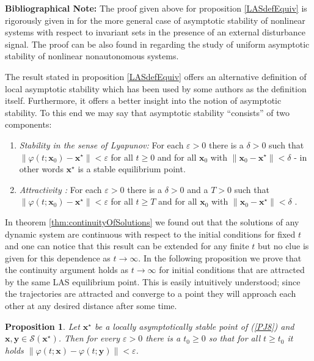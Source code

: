 \documentclass[a4paper,10pt,oneside]{book}
\newtheorem{proposition}[theorem]{Proposition}
\begin{document}
\noindent \textbf{Bibliographical Note: } The proof given above for proposition \ref{LASdefEquiv} is
rigorously given in \cite[Proposition 2.5]{Lin+96} for the more general case of asymptotic stability
of nonlinear systems with respect to invariant sets in the presence of an external disturbance signal.
The proof can be also found in \cite[Lemma 4.5]{Kha02} regarding the study of uniform asymptotic stability
of nonlinear nonautonomous systems.

%
%
%
%
%
%


The result stated in proposition \ref{LASdefEquiv} offers an alternative definition of local asymptotic stability which has been used by some authors as the definition itself. Furthermore, it offers a better insight into the notion of asymptotic stability. To this end we may say that asymptotic stability ``consists'' of two components:
\begin{enumerate}
 \item \emph{Stability in the sense of Lyapunov:} For each $\varepsilon>0$ there is a $\delta>0$ such that $\|\varphi(t;\mathbf{x}_0)-\mathbf{x}^\star\|<\varepsilon$ for all $t\geq 0$ and for all $\mathbf{x}_0$ with $\|\mathbf{x}_0-\mathbf{x}^\star\|<\delta$ - in other words $\mathbf{x}^\star$ is a stable equilibrium point.
 \item \emph{Attractivity :} For each $\varepsilon>0$ there is a $\delta>0$ and a $T>0$ such that $\|\varphi(t;\mathbf{x}_0)-\mathbf{x}^\star\|<\varepsilon$ for all $t\geq T$ and for all $\mathbf{x}_0$ with $\|\mathbf{x}_0-\mathbf{x}^\star\|<\delta$ .
\end{enumerate}
In theorem \ref{thm:continuityOfSolutions} we found out that the solutions of any dynamic system are continuous with respect to the initial conditions for fixed $t$ and one can notice that this result can be extended for any finite $t$ but no clue is given for this dependence as $t\to\infty$. In the following proposition we prove that the continuity argument holds as $t\to\infty$ for initial conditions that are attracted by the same LAS equilibrium point. This is easily intuitively understood; since the trajectories are attracted and converge to a point they will approach each other at any desired distance after some time.
\begin{proposition}
 Let $\mathbf{x}^\star$ be a locally asymptotically stable point of (\ref{PJ8}) and $\mathbf{x},\mathbf{y}\in\mathcal{S}(\mathbf{x}^\star)$. Then for every $\varepsilon>0$ there is a $t_0\geq 0$ so that for all $t\geq t_0$ it holds $\|\varphi(t;\mathbf{x})-\varphi(t;\mathbf{y})\|<\varepsilon$.
\end{proposition}
\end{document}
